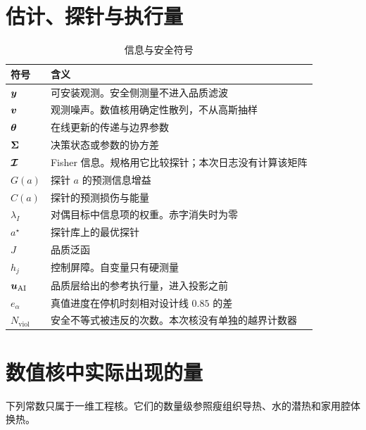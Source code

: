 \section{估计、探针与执行量}

\begin{table}[htbp]
\centering
\caption{信息与安全符号}
\label{tab:app-sym-info}
{\footnotesize\setlength{\tabcolsep}{2pt}
\begin{tabular}{@{}l p{4.2cm}@{}}

\toprule
符号 & 含义 \\
\midrule
\(\bm{y}\) & 可安装观测。安全侧测量不进入品质滤波 \\
\(\bm{v}\) & 观测噪声。数值核用确定性散列，不从高斯抽样 \\
\(\bm{\theta}\) & 在线更新的传递与边界参数 \\
\(\bm{\Sigma}\) & 决策状态或参数的协方差 \\
\(\bm{\mathcal{I}}\) & Fisher 信息。规格用它比较探针；本次日志没有计算该矩阵 \\
\(G(a)\) & 探针 \(a\) 的预测信息增益 \\
\(C(a)\) & 探针的预测损伤与能量 \\
\(\lambda_I\) & 对偶目标中信息项的权重。赤字消失时为零 \\
\(a^\star\) & 探针库上的最优探针 \\
\(J\) & 品质泛函 \\
\(h_j\) & 控制屏障。自变量只有硬测量 \\
\(\bm{u}_{\mathrm{AI}}\) & 品质层给出的参考执行量，进入投影之前 \\
\(e_{\alpha}\) & 真值进度在停机时刻相对设计线 \(0.85\) 的差 \\
\(N_{\mathrm{viol}}\) & 安全不等式被违反的次数。本次核没有单独的越界计数器 \\
\bottomrule
\end{tabular}}
\end{table}


\section{数值核中实际出现的量}

下列常数只属于一维工程核。它们的数量级参照瘦组织导热、水的潜热和家用腔体换热。

